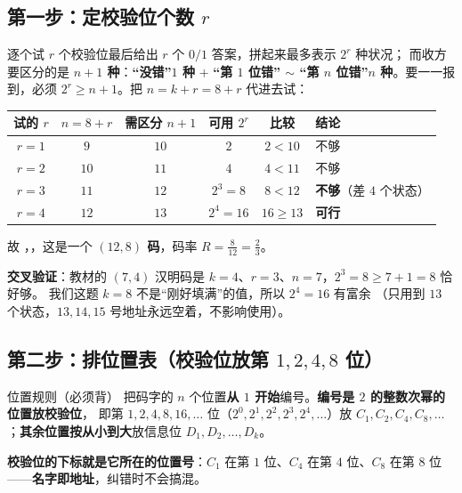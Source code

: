 \documentclass[11pt,a4paper]{ctexart}
\begin{document}
\subsection{第一步：定校验位个数 $r$}

\begin{calc}{逐个试}
$r$ 个校验位最后给出 $r$ 个 $0/1$ 答案，拼起来最多表示 $2^{r}$ 种状况；
而收方要区分的是 \textbf{$n+1$ 种}：\textbf{“没错”$1$ 种} $+$ \textbf{“第 $1$ 位错”
$\sim$ “第 $n$ 位错”$n$ 种}。要一一报到，必须 $2^{r}\ge n+1$。把 $n=k+r=8+r$ 代进去试：

\begin{center}\small
\setlength{\tabcolsep}{7pt}
\begin{tabular}{@{}ccccc l@{}}
\toprule
试的 $r$ & $n=8+r$ & 需区分 $n+1$ & 可用 $2^{r}$ & 比较 & 结论\\
\midrule
$r=1$ & $9$ & $10$ & $2$ & $2<10$ & 不够\\
$r=2$ & $10$ & $11$ & $4$ & $4<11$ & 不够\\
$r=3$ & $11$ & $12$ & $2^{3}=8$ & $8<12$ & \textbf{不够}（差 $4$ 个状态）\\
$r=4$ & $12$ & $13$ & $2^{4}=16$ & $16\ge13$ & \textbf{可行}\\
\bottomrule
\end{tabular}
\end{center}

故 ，，这是一个 \textbf{$(12,8)$ 码}，码率 $R=\frac{8}{12}=\frac23$。
\end{calc}

\textbf{交叉验证}：教材的 $(7,4)$ 汉明码是 $k=4$、$r=3$、$n=7$，$2^{3}=8\ge7+1=8$ 恰好够。
我们这题 $k=8$ 不是“刚好填满”的值，所以 $2^{4}=16$ 有富余
（只用到 $13$ 个状态，$13,14,15$ 号地址永远空着，不影响使用）。

\subsection{第二步：排位置表（校验位放第 $1,2,4,8$ 位）}

\begin{defbox}{位置规则（必须背）}
把码字的 $n$ 个位置\textbf{从 $1$ 开始}编号。\textbf{编号是 $2$ 的整数次幂的位置放校验位}，
即第 $1,2,4,8,16,\dots$ 位（$2^{0},2^{1},2^{2},2^{3},2^{4},\dots$）放
$C_1,C_2,C_4,C_8,\dots$；\textbf{其余位置按从小到大}放信息位 $D_1,D_2,\dots,D_k$。

\textbf{校验位的下标就是它所在的位置号}：$C_1$ 在第 $1$ 位、$C_4$ 在第 $4$ 位、$C_8$ 在第 $8$ 位
——\textbf{名字即地址}，纠错时不会搞混。
\end{defbox}
\end{document}
